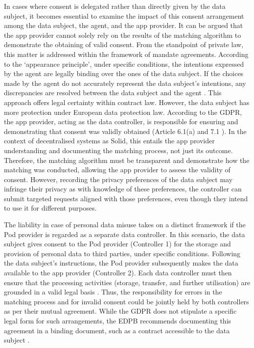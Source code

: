 In cases where consent is delegated rather than directly given by the data subject, it becomes essential to examine the impact of this consent arrangement among the data subject, the agent, and the app provider.
It can be argued that the app provider cannot solely rely on the results of the matching algorithm to demonstrate the obtaining of valid consent.
From the standpoint of private law, this matter is addressed within the framework of mandate agreements.
According to the `appearance principle', under specific conditions, the intentions expressed by the agent are legally binding over the ones of the data subject.
If the choices made by the agent do not accurately represent the data subject's intentions, any discrepancies are resolved between the data subject and the agent \citep{le_metayer_automated_2009}.
This approach offers legal certainty within contract law.
However, the data subject has more protection under European data protection law.
According to the GDPR, the app provider, acting as the data controller, is responsible for ensuring and demonstrating that consent was validly obtained (Article 6.1(a) and 7.1 \citeyearpar{noauthor_regulation_2016}).
In the context of decentralised systems as Solid, this entails the app provider understanding and documenting the matching process, not just its outcome.
Therefore, the matching algorithm must be transparent and demonstrate how the matching was conducted, allowing the app provider to assess the validity of consent.
However, recording the privacy preferences of the data subject may infringe their privacy as with knowledge of these preferences, the controller can submit targeted requests aligned with those preferences, even though they intend to use it for different purposes.

The liability in case of personal data misuse takes on a distinct framework if the Pod provider is regarded as a separate data controller.
In this scenario, the data subject gives consent to the Pod provider (Controller 1) for the storage and provision of personal data to third parties, under specific conditions.
Following the data subject's instructions, the Pod provider subsequently makes the data available to the app provider (Controller 2).
Each data controller must then ensure that the processing activities (storage, transfer, and further utilisation) are grounded in a valid legal basis \citep{european_data_protection_board_guidelines_2020}.
Thus, the responsibility for errors in the matching process and for invalid consent could be jointly held by both controllers as per their mutual agreement.
While the GDPR does not stipulate a specific legal form for such arrangements, the EDPB recommends documenting this agreement in a binding document, such as a contract accessible to the data subject \citep{european_data_protection_board_guidelines_2020}.


